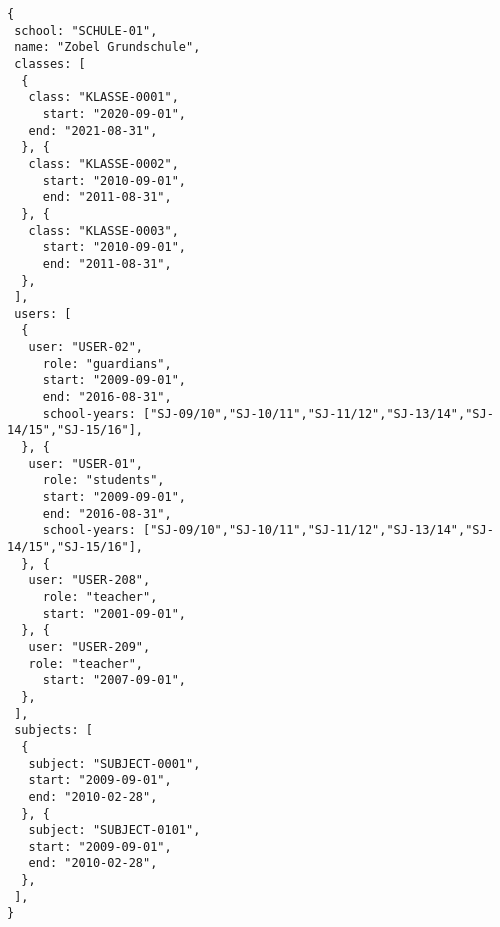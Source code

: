 
\begin{lstlisting}[caption={Schulen-Datenmodell Beispiel 1},frame=tlrb]
{
 school: "SCHULE-01",
 name: "Zobel Grundschule",
 classes: [ 
  {
   class: "KLASSE-0001",
	 start: "2020-09-01",
   end: "2021-08-31",
  }, {
   class: "KLASSE-0002",
	 start: "2010-09-01",
	 end: "2011-08-31",
  }, {
   class: "KLASSE-0003", 
	 start: "2010-09-01",
	 end: "2011-08-31",
  },
 ],
 users: [
  {
   user: "USER-02",
 	 role: "guardians",
	 start: "2009-09-01",
	 end: "2016-08-31",
	 school-years: ["SJ-09/10","SJ-10/11","SJ-11/12","SJ-13/14","SJ-14/15","SJ-15/16"],
  }, {
   user: "USER-01",
	 role: "students",
	 start: "2009-09-01",
	 end: "2016-08-31",
	 school-years: ["SJ-09/10","SJ-10/11","SJ-11/12","SJ-13/14","SJ-14/15","SJ-15/16"],
  }, {
   user: "USER-208",
	 role: "teacher",
	 start: "2001-09-01",
  }, {
   user: "USER-209",
   role: "teacher",
 	 start: "2007-09-01",
  },
 ],
 subjects: [
  {
   subject: "SUBJECT-0001",
   start: "2009-09-01",
   end: "2010-02-28",
  }, {
   subject: "SUBJECT-0101",
   start: "2009-09-01",
   end: "2010-02-28",
  }, 
 ],
}
\end{lstlisting}
